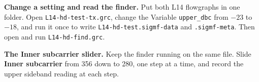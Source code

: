 \documentclass{exam}
\makeatletter
\def\keysol#1{\ifcsname keysol@#1\endcsname\csname keysol@#1\endcsname\fi}
\makeatother
\begin{document}
\begin{questions}


\question \textbf{Change a setting and read the finder.} Put both L14 flowgraphs in one
folder. Open \texttt{L14-hd-test-tx.grc}, change the Variable \texttt{upper\_dbc} from $-23$
to $-18$, and run it once to write \texttt{L14-hd-test.sigmf-data} and \texttt{.sigmf-meta}. Then open and run
\texttt{L14-hd-find.grc}.


\newpage
\question \textbf{The Inner subcarrier slider.} Keep the finder running on the same file.
Slide \textbf{Inner subcarrier} from 356 down to 280, one step at a time, and record the
upper sideband reading at each step.


\end{questions}
\end{document}
